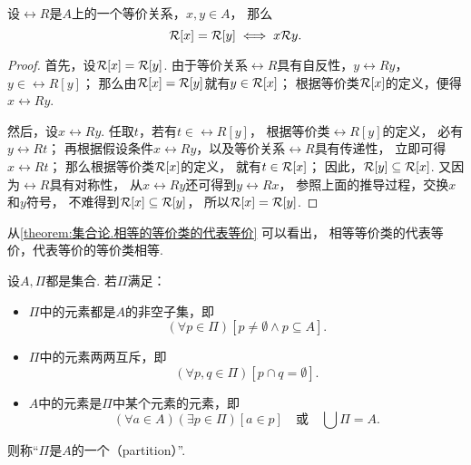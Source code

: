\begin{lemma}\label{theorem:集合论.相等的等价类的代表等价}
设\(\rel{R}\)是\(A\)上的一个等价关系，\(x,y \in A\)，
那么\begin{equation*}
	\EquivalenceClassBH{x}[\rel{R}] = \rel{R}[y]
	\iff
	x \rel{R} y.
\end{equation*}
\begin{proof}
首先，设\(\EquivalenceClassBH{x}[\rel{R}] = \rel{R}[y]\).
由于等价关系\(\rel{R}\)具有自反性，\(y \rel{R} y\)，\(y \in \rel{R}[y]\)；
那么由\(\EquivalenceClassBH{x}[\rel{R}] = \rel{R}[y]\)就有\(y \in \EquivalenceClassBH{x}[\rel{R}]\)；
根据等价类\(\EquivalenceClassBH{x}[\rel{R}]\)的定义，便得\(x \rel{R} y\).

然后，设\(x \rel{R} y\).
任取\(t\)，若有\(t \in \rel{R}[y]\)，
根据等价类\(\rel{R}[y]\)的定义，
必有\(y \rel{R} t\)；
再根据假设条件\(x \rel{R} y\)，以及等价关系\(\rel{R}\)具有传递性，
立即可得\(x \rel{R} t\)；
那么根据等价类\(\EquivalenceClassBH{x}[\rel{R}]\)的定义，
就有\(t \in \EquivalenceClassBH{x}[\rel{R}]\)；
因此，\(\rel{R}[y] \subseteq \EquivalenceClassBH{x}[\rel{R}]\).
又因为\(\rel{R}\)具有对称性，
从\(x \rel{R} y\)还可得到\(y \rel{R} x\)，
参照上面的推导过程，交换\(x\)和\(y\)符号，
不难得到\(\EquivalenceClassBH{x}[\rel{R}] \subseteq \rel{R}[y]\)，
所以\(\EquivalenceClassBH{x}[\rel{R}] = \rel{R}[y]\).
\end{proof}
\end{lemma}
从\cref{theorem:集合论.相等的等价类的代表等价} 可以看出，
相等等价类的代表等价，代表等价的等价类相等.

\begin{definition}\label{definition:集合论.划分的定义}
设\(A,\Pi\)都是集合.
若\(\Pi\)满足：
\begin{itemize}
	\item \(\Pi\)中的元素都是\(A\)的非空子集，即\begin{equation*}
		(\forall p \in \Pi)
		[
			p \neq \emptyset
			\land
			p \subseteq A
		].
	\end{equation*}

	\item \(\Pi\)中的元素两两互斥，即\begin{equation*}
		(\forall p,q \in \Pi)[p \cap q = \emptyset].
	\end{equation*}

	\item \(A\)中的元素是\(\Pi\)中某个元素的元素，即\begin{equation*}
		(\forall a \in A)
		(\exists p \in \Pi)
		[a \in p]
		\quad\text{或}\quad
		\bigcup\Pi = A.
	\end{equation*}
\end{itemize}
则称“\(\Pi\)是\(A\)的一个（partition）”.
\end{definition}

